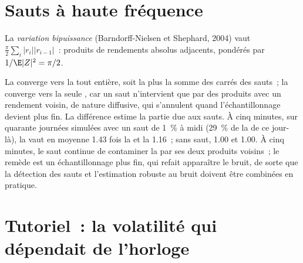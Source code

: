 \section{Sauts à haute fréquence}

\begin{definition}\label{def:qm:high-frequency-econometrics:bipower}
La \emph{variation bipuissance} (Barndorff-Nielsen et Shephard, 2004) vaut $\frac\pi2\sum_i|r_i||r_{i-1}|$~: produits de rendements absolus adjacents, pondérés par
$1/\E|Z|^2 = \pi/2$.
\end{definition}

La  converge vers la  tout entière, soit la  plus la somme des carrés des sauts~; la  converge vers la seule ,
car un saut n'intervient que par des produits avec un rendement voisin, de nature diffusive, qui s'annulent quand l'échantillonnage devient plus fin. La différence estime la partie due aux sauts. À
cinq minutes, sur quarante journées simulées avec un saut de 1~\% à midi (29~\% de la  de ce jour-là), la  vaut en moyenne 1.43 fois la 
et la  1.16~; sans saut, 1.00 et 1.00. À cinq minutes, le saut continue de contaminer la  par ses deux produits voisins~; le
remède est un échantillonnage plus fin, qui refait apparaître le bruit, de sorte que la détection des sauts et l'estimation robuste au bruit doivent être combinées en pratique.

\section{Tutoriel~: la volatilité qui dépendait de l'horloge}\label{tut:qm:high-frequency-econometrics:clock}

